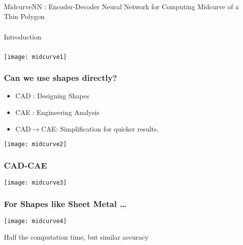 \begin{frame}[fragile]\frametitle{}
\begin{center}
\Large{MidcurveNN : Encoder-Decoder Neural Network for Computing Midcurve of a Thin Polygon}
\end{center}
\end{frame}

\begin{frame}[fragile]\frametitle{}
\begin{center}
{\Large Introduction}
\end{center}
\end{frame}

\begin{frame}[fragile]\frametitle{}
\begin{center}
\texttt{[image: midcurve1]}
\end{center}
\end{frame}


\begin{frame}[fragile]\frametitle{Can we use shapes directly?}
	\begin{itemize}
	\item CAD : Designing Shapes
	\item CAE : Engineering Analysis
	\item CAD$\rightarrow$CAE: Simplification for quicker results.
	\end{itemize}

\begin{center}
\texttt{[image: midcurve2]}
\end{center}

\end{frame}

\begin{frame}[fragile]\frametitle{CAD-CAE}
\begin{center}
\texttt{[image: midcurve3]}
\end{center}
\end{frame}

\begin{frame}[fragile]\frametitle{For Shapes like Sheet Metal \ldots}
\begin{center}
\texttt{[image: midcurve4]}
\end{center}
Half the computation time, but similar accuracy
\end{frame}

